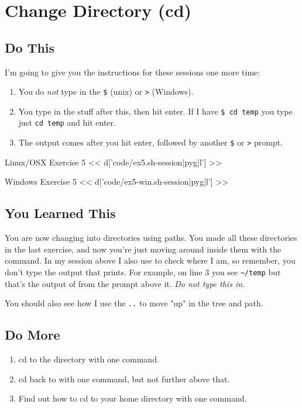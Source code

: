 \chapter{Change Directory (cd)}

\section{Do This}

I'm going to give you the instructions for these sessions one more time:

\begin{enumerate} 
\item You do \emph{not} type in the \verb|$| (unix) or \verb|>| (Windows).
\item You type in the stuff after this, then hit enter.  If I have \verb|$ cd temp| you type just \verb|cd temp| and hit enter.
\item The output comes after you hit enter, followed by another \verb|$| or \verb|>| prompt.
\end{enumerate}

\begin{code}{Linux/OSX Exercise 5}
<< d['code/ex5.sh-session|pyg|l'] >>
\end{code}

\begin{code}{Windows Exercise 5}
<< d['code/ex5-win.sh-session|pyg|l'] >>
\end{code}

\section{You Learned This}

You are now changing into directories using paths.  You made all these directories
in the last exercise, and now you're just moving around inside them with the
 command.  In my session above I also use  to check
where I am, so remember, you don't type the output that  prints.
For example, on line 3 you see \verb|~/temp| but that's the output of 
from the prompt above it.  \emph{Do not type this in}.

You should also see how I use the \verb|..| to move "up" in the tree and path.

\section{Do More}

\begin{enumerate}
\item cd to the  directory with one command.
\item cd back to  with one command, but not further above that.
\item Find out how to cd to your home directory with one command.
\end{enumerate}

